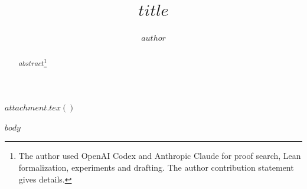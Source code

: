 \documentclass[10pt]{article}
\title{$title$}
\author{$author$}
\begin{document}
$attachment.tex()$
\maketitle
\begin{abstract}
$abstract$\footnote{The author used OpenAI Codex and Anthropic Claude for proof search, Lean formalization, experiments and drafting. The author contribution statement gives details.}
\end{abstract}
$body$
\end{document}
